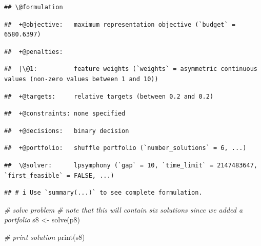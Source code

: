 \documentclass[
  12pt,
]{book}
\newenvironment{Shaded}{\begin{snugshade}}{\end{snugshade}}
\newcommand{\CommentTok}[1]{\textcolor[rgb]{0.56,0.35,0.01}{\textit{#1}}}
\newcommand{\FunctionTok}[1]{\textcolor[rgb]{0.00,0.00,0.00}{#1}}
\newcommand{\NormalTok}[1]{#1}
\newcommand{\OtherTok}[1]{\textcolor[rgb]{0.56,0.35,0.01}{#1}}
\begin{document}
\begin{verbatim}
## \@formulation
\end{verbatim}

\begin{verbatim}
##  +@objective:   maximum representation objective (`budget` = 6580.6397)
\end{verbatim}

\begin{verbatim}
##  +@penalties:
\end{verbatim}

\begin{verbatim}
##  |\@1:          feature weights (`weights` = asymmetric continuous values (non-zero values between 1 and 10))
\end{verbatim}

\begin{verbatim}
##  +@targets:     relative targets (between 0.2 and 0.2)
\end{verbatim}

\begin{verbatim}
##  +@constraints: none specified
\end{verbatim}

\begin{verbatim}
##  +@decisions:   binary decision
\end{verbatim}

\begin{verbatim}
##  +@portfolio:   shuffle portfolio (`number_solutions` = 6, ...)
\end{verbatim}

\begin{verbatim}
##  \@solver:      lpsymphony (`gap` = 10, `time_limit` = 2147483647, `first_feasible` = FALSE, ...)
\end{verbatim}

\begin{verbatim}
## # i Use `summary(...)` to see complete formulation.
\end{verbatim}

\begin{Shaded}
\begin{Highlighting}[]
\CommentTok{\# solve problem}
\CommentTok{\# note that this will contain six solutions since we added a portfolio}
\NormalTok{s8 }\OtherTok{\textless{}{-}} \FunctionTok{solve}\NormalTok{(p8)}

\CommentTok{\# print solution}
\FunctionTok{print}\NormalTok{(s8)}
\end{Highlighting}
\end{Shaded}
\end{document}
